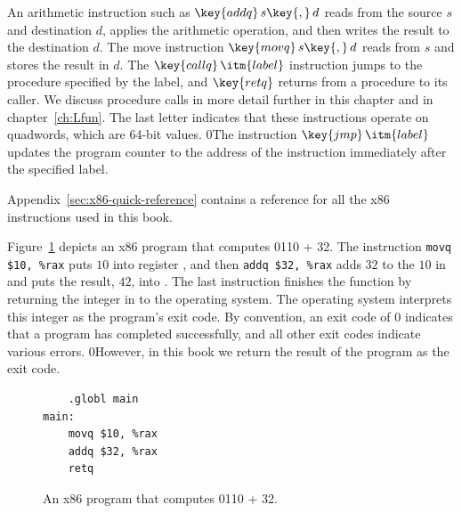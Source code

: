 \documentclass[7x10]{TimesAPriori_MIT}%
\def\racketEd{0}
\def\pythonEd{1}
\providecommand{\BookEdition}{1}
\let\edition\BookEdition
\newcommand{\racket}[1]{{\if\edition\racketEd{#1}\fi}}
\newcommand{\pythonColor}[0]{}
\newcommand{\python}[1]{{\if\edition\pythonEd\pythonColor #1\fi}}
\numberwithin{theorem}{chapter}
\numberwithin{definition}{chapter}
\numberwithin{equation}{chapter}
\begin{document}
An arithmetic instruction such as $\key{addq}\,s\key{,}\,d$ reads from
the source $s$ and destination $d$, applies the arithmetic operation,
and then writes the result to the destination $d$. 
%
The move instruction $\key{movq}\,s\key{,}\,d$ reads from $s$ and
stores the result in $d$.
%
The $\key{callq}\,\itm{label}$ instruction jumps to the procedure
specified by the label, and $\key{retq}$ returns from a procedure to
its caller. 
%
We discuss procedure calls in more detail further in this chapter and
in chapter~\ref{ch:Lfun}.
%
The last letter  indicates that these instructions operate on
quadwords, which are 64-bit values.
%
\racket{The instruction $\key{jmp}\,\itm{label}$ updates the program
  counter to the address of the instruction immediately after the
  specified label.}

Appendix~\ref{sec:x86-quick-reference} contains a reference for
all the x86 instructions used in this book.

Figure~\ref{fig:p0-x86} depicts an x86 program that computes
\racket{}\python{10 + 32}. The instruction
\lstinline{movq $10, %rax}
puts $10$ into register , and then \lstinline{addq $32, %rax}
adds $32$ to the $10$ in  and
puts the result, $42$, into .
%
The last instruction  finishes the  function by
returning the integer in  to the operating system. The
operating system interprets this integer as the program's exit
code. By convention, an exit code of 0 indicates that a program has
completed successfully, and all other exit codes indicate various
errors.
%
\racket{However, in this book we return the result of the program
  as the exit code.}

\begin{figure}[tbp]
\begin{minipage}{0.45\textwidth}
\begin{tcolorbox}[colback=white]
\begin{lstlisting}
    .globl main
main:
    movq $10, %rax
    addq $32, %rax
    retq
\end{lstlisting}
\end{tcolorbox}
\end{minipage}

\caption{An x86 program that computes
  \racket{}\python{10 + 32}.}
\label{fig:p0-x86}
\end{figure}
\end{document}
